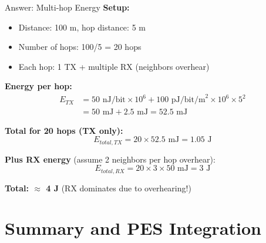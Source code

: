 \documentclass[aspectratio=169,11pt]{beamer}
\begin{document}
\begin{frame}{Answer: Multi-hop Energy}
    \textbf{Setup:}
    \begin{itemize}
        \item Distance: 100 m, hop distance: 5 m
        \item Number of hops: 100/5 = 20 hops
        \item Each hop: 1 TX + multiple RX (neighbors overhear)
    \end{itemize}
    
    \vspace{0.3cm}
    \textbf{Energy per hop:}
    \begin{align*}
        E_{TX} &= 50 \text{ nJ/bit} \times 10^6 + 100 \text{ pJ/bit/m}^2 \times 10^6 \times 5^2 \\
               &= 50 \text{ mJ} + 2.5 \text{ mJ} = 52.5 \text{ mJ}
    \end{align*}
    
    \textbf{Total for 20 hops (TX only):}
    \[
    E_{total,TX} = 20 \times 52.5 \text{ mJ} = 1.05 \text{ J}
    \]
    
    \textbf{Plus RX energy} (assume 2 neighbors per hop overhear):
    \[
    E_{total,RX} = 20 \times 3 \times 50 \text{ mJ} = 3 \text{ J}
    \]
    
    \textbf{Total: $\approx$ 4 J} (RX dominates due to overhearing!)
\end{frame}

\section{Summary and PES Integration}
\end{document}
